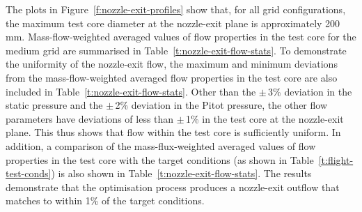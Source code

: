 \documentclass[12pt,a4paper]{article}
\begin{document}
The plots in Figure~\ref{f:nozzle-exit-profiles} show that, for all grid 
configurations, the maximum test core diameter at the nozzle-exit plane is 
approximately 200\,mm. Mass-flow-weighted averaged values of flow properties 
in the test core for the medium grid are summarised in 
Table~\ref{t:nozzle-exit-flow-stats}. To demonstrate the uniformity of the
nozzle-exit flow, the maximum and minimum deviations from the 
mass-flow-weighted averaged flow properties in the test core are also 
included in Table~\ref{t:nozzle-exit-flow-stats}. Other than the $\pm$\,3\%
deviation in the static pressure and the $\pm$\,2\% deviation in the Pitot
pressure, the other flow parameters have deviations of less than $\pm$\,1\%
in the test core at the nozzle-exit plane. This thus shows that flow within 
the test core is sufficiently uniform. In addition, a comparison of the
mass-flux-weighted averaged values of flow properties in the test core with
the target conditions (as shown in Table~\ref{t:flight-test-conds}) is also 
shown in Table~\ref{t:nozzle-exit-flow-stats}. The results demonstrate that 
the optimisation process produces a nozzle-exit outflow that matches to 
within 1\% of the target conditions.
%
\end{document}
